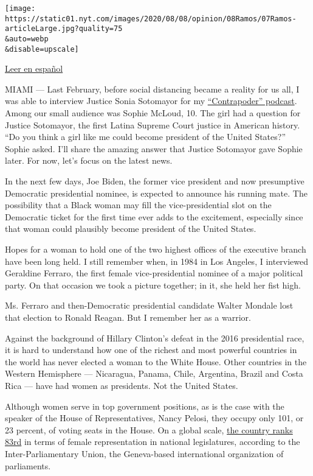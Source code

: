 \texttt{[image: https://static01.nyt.com/images/2020/08/08/opinion/08Ramos/07Ramos-articleLarge.jpg?quality=75\\\&auto=webp\\\&disable=upscale]}

\href{https://www.nytimes.com/es/2020/08/07/espanol/opinion/presidenta-estados-unidos.html}{Leer
en español}

MIAMI --- Last February, before social distancing became a reality for
us all, I was able to interview Justice Sonia Sotomayor for my
\href{https://bit.ly/2P3Ylta}{``Contrapoder'' podcast}. Among our small
audience was Sophie McLoud, 10. The girl had a question for Justice
Sotomayor, the first Latina Supreme Court justice in American history.
``Do you think a girl like me could become president of the United
States?'' Sophie asked. I'll share the amazing answer that Justice
Sotomayor gave Sophie later. For now, let's focus on the latest news.

In the next few days, Joe Biden, the former vice president and now
presumptive Democratic presidential nominee, is expected to announce his
running mate. The possibility that a Black woman may fill the
vice-presidential slot on the Democratic ticket for the first time ever
adds to the excitement, especially since that woman could plausibly
become president of the United States.

Hopes for a woman to hold one of the two highest offices of the
executive branch have been long held. I still remember when, in 1984 in
Los Angeles, I interviewed Geraldine Ferraro, the first female
vice-presidential nominee of a major political party. On that occasion
we took a picture together; in it, she held her fist high.

Ms. Ferraro and then-Democratic presidential candidate Walter Mondale
lost that election to Ronald Reagan. But I remember her as a warrior.

Against the background of Hillary Clinton's defeat in the 2016
presidential race, it is hard to understand how one of the richest and
most powerful countries in the world has never elected a woman to the
White House. Other countries in the Western Hemisphere --- Nicaragua,
Panama, Chile, Argentina, Brazil and Costa Rica --- have had women as
presidents. Not the United States.

Although women serve in top government positions, as is the case with
the speaker of the House of Representatives, Nancy Pelosi, they occupy
only 101, or 23 percent, of voting seats in the House. On a global
scale, \href{https://data.ipu.org/women-ranking?month=6\&year=2020}{the
country ranks 83rd} in terms of female representation in national
legislatures, according to the Inter-Parliamentary Union, the
Geneva-based international organization of parliaments.


